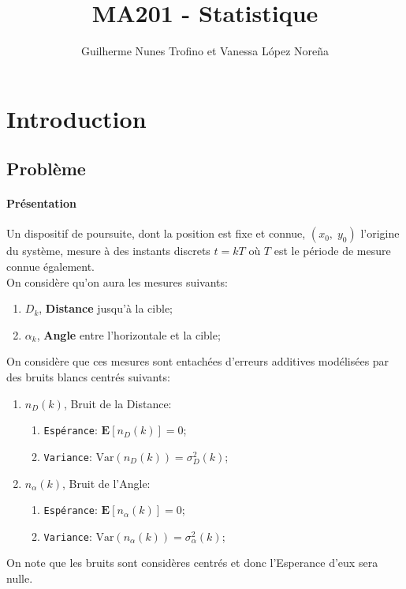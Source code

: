 \documentclass{article}
\title{MA201 - Statistique}
\author{Guilherme Nunes Trofino et Vanessa López Noreña}
\begin{document}
\maketitle

\newpage\tableofcontents

\section*{Introduction}
\subsection*{Problème}
\paragraph{Présentation}Un dispositif de poursuite, dont la position est fixe et connue, $(x_{0}, \; y_{0})$ l'origine du système, mesure à des instants discrets $t = kT$ où $T$ est le période de mesure connue également.\\

\noindent On considère qu'on aura les mesures suivants:
\begin{enumerate}[noitemsep]
    \item $D_{k}$, \textbf{Distance} jusqu'à la cible;
    \item $\alpha_{k}$, \textbf{Angle} entre l'horizontale et la cible;
\end{enumerate}
On considère que ces mesures sont entachées d'erreurs additives modélisées par des bruits blancs centrés \cite{bruitBlanc} suivants:
\begin{enumerate}
    \item $n_{D}(k)$, Bruit de la Distance:
    \begin{enumerate}[noitemsep]
        \item \texttt{Espérance}: $\mathbf{E}[n_{D}(k)] = 0$;
        \item \texttt{Variance}: $\text{Var}(n_{D}(k)) = \sigma_{D}^{2}(k)$;
    \end{enumerate}
    \item $n_{\alpha}(k)$, Bruit de l'Angle:
        \begin{enumerate}[noitemsep]
        \item \texttt{Espérance}: $\mathbf{E}[n_{\alpha}(k)] = 0$;
        \item \texttt{Variance}: $\text{Var}(n_{\alpha}(k)) = \sigma_{\alpha}^{2}(k)$;
    \end{enumerate}
\end{enumerate}
On note que les bruits sont considères centrés et donc l'Esperance d'eux sera nulle.
\end{document}
